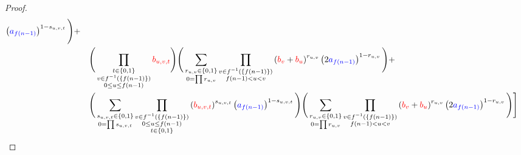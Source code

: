 \begin{proof}
\[\begin{aligned}
\left( {\color{blue} a_{f(n-1)}} \right)^{1-s_{u,v,t}} 
\Bigg) + \\ 
& \quad 
\Bigg(
\prod_{\substack{t \in \{0,1\} \\ v \in f^{-1}(\{ f(n-1) \}) \\ 0 \leq u \leq f(n-1)}} 
{\color{red} b_{u,v,t}} 
\Bigg)
\Bigg( 
\sum_{\substack{r_{u,v} \in \{0,1\} \\ 0 = \prod r_{u,v}}} 
\prod_{\substack{v \in f^{-1}(\{ f(n-1) \}) \\ f(n-1) < u < v}} 
\left( {\color{red} b_v} + {\color{red} b_u} \right)^{r_{u,v}} 
\left( 2 {\color{blue} a_{f(n-1)}} \right)^{1-r_{u,v}} 
\Bigg) + \\ 
& \quad 
\Bigg( 
\sum_{\substack{s_{u,v,t} \in \{0,1\} \\ 0 = \prod s_{u,v,t}}} 
\prod_{\substack{v \in f^{-1}(\{ f(n-1) \}) \\ 0 \leq u \leq f(n-1) \\ t \in \{0,1\}}} 
\left( {\color{red} b_{u,v,t}} \right)^{s_{u,v,t}} 
\left( {\color{blue} a_{f(n-1)}} \right)^{1-s_{u,v,t}} 
\Bigg)
\Bigg( 
\sum_{\substack{r_{u,v} \in \{0,1\} \\ 0 = \prod r_{u,v}}} 
\prod_{\substack{v \in f^{-1}(\{ f(n-1) \}) \\ f(n-1) < u < v}} 
\left( {\color{red} b_v} + {\color{red} b_u} \right)^{r_{u,v}} 
\left( 2 {\color{blue} a_{f(n-1)}} \right)^{1-r_{u,v}} 
\Bigg)
\Bigg] 
\end{aligned}
\]


\end{proof}
